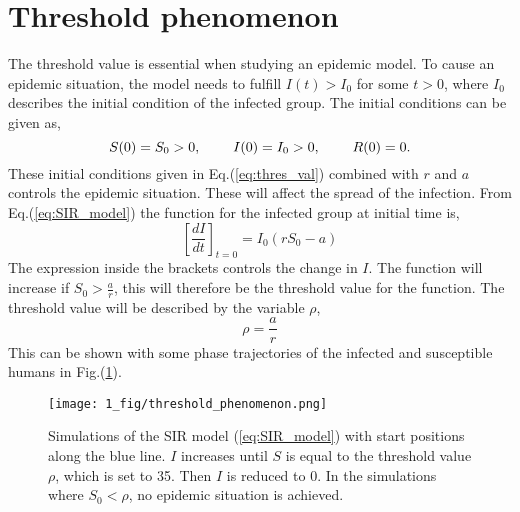 \documentclass[%
twoside,                 %
final,                   %
chapterprefix=true,      %
open=right               %
10pt]{book}
\begin{document}
\section{Threshold phenomenon}
\label{section:1threshold_phenomenon}
The threshold value is essential when studying an epidemic model. To cause an epidemic situation, the model needs to fulfill $I(t)> I_0$ for some $t>0$, where $I_0$ describes the initial condition of  the infected group. The initial conditions can be given as,
\begin{equation} \label{eq:thres_val}
S(0)=S_0 > 0,\hspace{8mm} I(0)=I_0>0,\hspace{8mm} R(0) =0.
\end{equation}
These initial conditions given in Eq.(\ref{eq:thres_val}) combined with $r$ and $a$ controls the epidemic situation. These will affect the spread of the infection. From Eq.(\ref{eq:SIR_model}) the function for the infected group at initial time is,
\begin{equation}
\left[\frac{dI}{dt}\right]_{t=0} = I_0(rS_0-a)
\end{equation}
The expression inside the brackets controls the change in $I$. The function will increase if $S_0 > \frac{a}{r}$, this will therefore be the threshold value for the function. The threshold value will be described by the variable $\rho$,
\begin{equation} \label{eq:threshold_value}
\rho = \frac{a}{r}
\end{equation}
This can be shown with some phase trajectories of the infected and susceptible humans in Fig.(\ref{fig:threshold_phenomenon}).  


\begin{figure}[ht]
  \centerline{\texttt{[image: 1\_fig/threshold\_phenomenon.png]}}
  \caption{
  \label{fig:threshold_phenomenon} Simulations of the SIR model (\ref{eq:SIR_model}) with start positions along the blue line. $I$ increases until $S$ is equal to the threshold value $\rho$, which is set to 35. Then $I$ is reduced to 0. In the simulations where $S_0 < \rho$, no epidemic situation is achieved.
  }
\end{figure}
\end{document}
